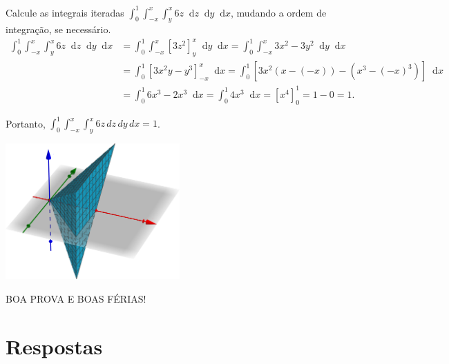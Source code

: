 \documentclass[12pt,a4paper]{article}
\newcommand*\diff{\mathop{}\!\mathrm{d}}
\begin{document}
\begin{ExerciseList}
\Exercise[title={2,5}] Calcule as integrais iteradas $\int_{0}^{1}\int_{-x}^{x}\int_{y}^{x} 6z \diff{z}\diff{y}\diff{x}$, mudando a ordem de integração, se necessário.
\Answer
\begin{align*}
    \int_{0}^{1}\int_{-x}^{x}\int_{y}^{x} 6z \diff{z}\diff{y}\diff{x}
    & = \int_{0}^{1}\int_{-x}^{x} \left[ 3z^2 \right]_{y}^{x} \diff{y}\diff{x}
      = \int_{0}^{1}\int_{-x}^{x} 3x^2 - 3y^2 \diff{y}\diff{x} \\
    & = \int_{0}^{1} \left[ 3x^2y - y^3 \right]_{-x}^{x} \diff{x}
      = \int_{0}^{1} \left[ 3x^2(x - (-x)) - (x^3 - (-x)^3) \right] \diff{x} \\
    &
      = \int_{0}^{1} 6x^3 - 2x^3 \diff{x}
      = \int_{0}^{1} 4x^3 \diff{x}
      = [x^4]_{0}^{1}
      = 1 - 0
      = 1.
\end{align*}

Portanto, \(\boxed{\int_{0}^{1} \int_{-x}^{x} \int_{y}^{x} 6z \, dz \, dy \, dx = 1}\).

\begin{center}
\includegraphics[width=0.5\textwidth]{img/integral-tripla-tetraedro.png}
\end{center}

\end{ExerciseList}

\vfill
\begin{center}
BOA PROVA E BOAS FÉRIAS!
\end{center}

\newpage
\restoregeometry
\section*{Respostas}
\shipoutAnswer
\end{document}
